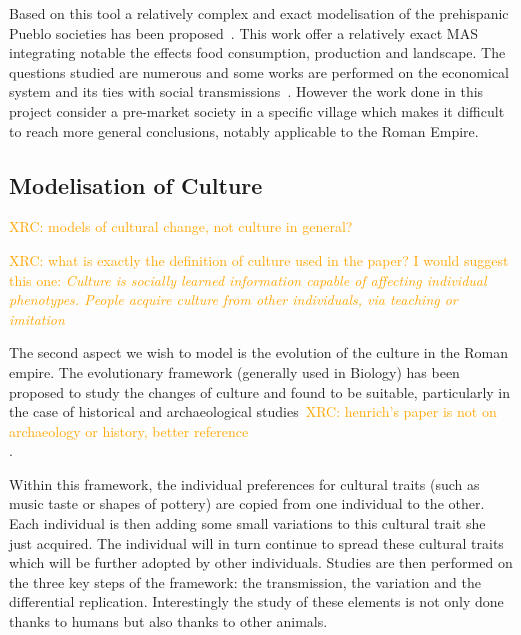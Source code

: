 \documentclass{wscpaperproc}
\newcommand{\memo}[2]{\textcolor{#1}{#2}}
\newcommand{\xrc}[1]{\memo{orange}{XRC: #1\\}}
\begin{document}
Based on this tool a relatively complex and exact modelisation of the prehispanic Pueblo societies has been proposed~\cite{kohler_modelling_2012}. This work offer a relatively exact MAS integrating notable the effects food consumption, production and landscape. The questions studied are  numerous and some works are performed on the economical system and its ties with social transmissions~\cite{kobti_emergence_2006,cockburn_simulating_2013}. However the work done in this project consider a pre-market society in a specific village which makes it difficult to reach more general conclusions, notably applicable to the Roman Empire.




\subsection{Modelisation of Culture}

\xrc{models of cultural change, not culture in general?}

\xrc{what is exactly the definition of culture used in the paper? I would suggest this one: \emph{Culture is socially learned information capable of affecting  individual phenotypes. People acquire culture from other individuals, via teaching or imitation} \cite{richerson_principles_1996}}

The second aspect we wish to model is the evolution of the culture in the Roman empire. The evolutionary framework (generally used in Biology) has been proposed to study the changes of culture and found to be suitable,  particularly in the case of historical and archaeological studies~\cite{lycett_cultural_2015,henrich_evolution_2003}\xrc{henrich's paper is not on archaeology or history, better reference \cite{shennan_evolution_2008}}.

Within this framework, the individual preferences for cultural traits (such as music taste or shapes of pottery) are copied from one individual to the other. Each individual is then adding some small variations to this cultural trait she just acquired. The individual will in turn continue to spread these cultural traits which will be further adopted by other individuals. Studies are then performed on the three key steps of the framework: the transmission, the variation and the differential replication. Interestingly the study of these elements is not only done thanks to humans but also thanks to other animals.
\end{document}
